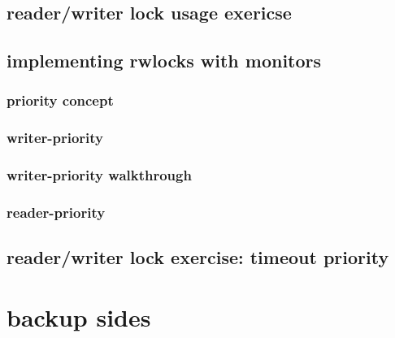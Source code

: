 

\subsection{reader/writer lock usage exericse}



\subsection{implementing rwlocks with monitors}



\subsubsection{priority concept}



\subsubsection{writer-priority}



\subsubsection{writer-priority walkthrough}


\subsubsection{reader-priority}



\subsection{reader/writer lock exercise: timeout priority}





\section{backup sides}
\begin{frame}{}
\end{frame}

